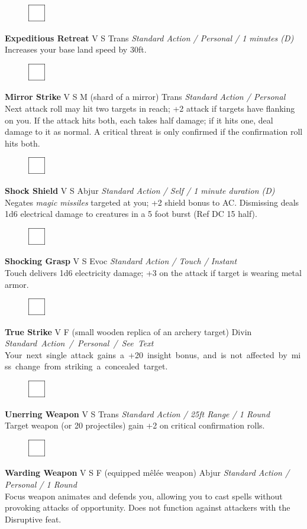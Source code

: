 \documentclass[letterpaper]{article}
\newcommand{\e}[1]{\emph{#1}}
\newcommand{\B}[1]{\textbf{#1}}
\newcommand{\spell}[7]{
\begin{figure}
\vspace{-13pt}
\ifstrequal{#2}{Full}{  \includegraphics[width=2em]{Checkbox-Full}}{
\ifstrequal{#2}{Scroll}{\includegraphics[width=2em]{Checkbox-S}}{
                        \includegraphics[width=2em]{Checkbox}}}
\ifstrequal{#7}{}{\vspace{-1em}}{\vspace{#7}}
\end{figure}
 \B{#1} #3 {
    \ifstrequal{#4}{Conj}{\color{Plum}Conj}{%
    \ifstrequal{#4}{Divin}{\color{YellowOrange}Divin}{%
    \ifstrequal{#4}{Ench}{\color{VioletRed}Ench}{%
    \ifstrequal{#4}{Trans}{\color{LimeGreen}Trans}{%
    \ifstrequal{#4}{Evoc}{\color{RedOrange}Evoc}{%
    \ifstrequal{#4}{Illu}{\color{ProcessBlue}Illu}{%
    \ifstrequal{#4}{Abjur}{\color{CadetBlue}Abjur}{%
    \ifstrequal{#4}{Necro}{\color{Red}Necro}{%
}}}}}}}}}
{\footnotesize \e{#5}} \\
#6
}
\newenvironment{notesection}[1]
{ {\huge \B{#1}}\hrule\vspace{0.5em}\begingroup\fontsize{9pt}{12pt}\selectfont}
{\endgroup}
\newcommand{\person}[3]{\B{#1
    \ifstrequal{#2}{M}{{\color{ProcessBlue}\male}}{%
    \ifstrequal{#2}{F}{\color{VioletRed}\female}{}}}{\scriptsize #3}}
\begin{document}
\spell{Expeditious Retreat}{}{V S}{Trans}{Standard Action / Personal / 1 minutes (D)}{%
Increases your base land speed by 30ft.}{}\\[-1em] %

\spell{Mirror Strike}{}{V S M (shard of a mirror)}{Trans}{Standard Action / Personal}{%
Next attack roll may hit two targets in reach; +2 attack if targets have flanking on you. If the attack hits both, each takes half damage; if it hits one, deal damage to it as normal. A critical threat is only confirmed if the confirmation roll hits both.}{}\\[-1em]

\spell{Shock Shield}{}{V S}{Abjur}{Standard Action / Self / 1 minute duration (D)}{%
Negates \emph{magic missiles} targeted at you; +2 shield bonus to AC. Dismissing deals 1d6 electrical damage to creatures in a 5 foot burst (Ref DC 15 half).}{}\\[-1em] %

\spell{Shocking Grasp}{}{V S}{Evoc}{Standard Action / Touch / Instant}{%
Touch delivers 1d6 electricity damage; +3 on the attack if target is wearing metal armor.}{}\\[-1em] %

\spell{True Strike}{}{V F (small wooden replica of an archery target)}{Divin}{\mbox{Standard Action / Personal / See Text}}{%
\mbox{Your next single attack gains a +20 insight bonus, and is not affected by miss change from striking a concealed target.}}{}\\[-1em]

\spell{Unerring Weapon}{}{V S}{Trans}{Standard Action / 25ft Range / 1 Round}{%
Target weapon (or 20 projectiles) gain +2 on critical confirmation rolls.}{}\\[-1em] %

\spell{Warding Weapon}{}{V S F (equipped m\^{e}l\'{e}e weapon)}{Abjur}{Standard Action / Personal / 1 Round}{%
Focus weapon animates and defends you, allowing you to cast spells without provoking attacks of opportunity. Does not function against attackers with the Disruptive feat.}{}\\

\twocolumn
\end{document}

